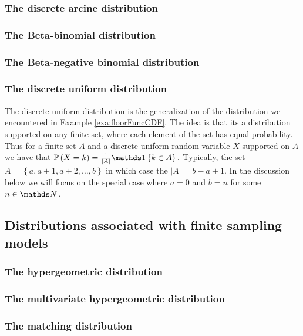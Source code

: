 \subsubsection{The discrete arcine distribution}

\subsubsection{The Beta-binomial distribution}

\subsubsection{The Beta-negative binomial distribution}

\subsubsection{The discrete uniform distribution\label{subsec:discreteUniformDistribution}}

The discrete uniform distribution is the generalization of the distribution
we encountered in Example \ref{exa:floorFuncCDF}. The idea is that
its a distribution supported on any finite set, where each element
of the set has equal probability. Thus for a finite set $A$ and a
discrete uniform random variable $X$ supported on $A$ we have that
$\P\left(X=k\right)=\frac{1}{\lvert A\rvert}\indicate\left\{ k\in A\right\} .$
Typically, the set $A=\left\{ a,a+1,a+2,\ldots,b\right\} $ in which
case the $\lvert A\rvert=b-a+1$. In the discussion below we will
focus on the special case where $a=0$ and $b=n$ for some $n\in\N$.


\subsection{Distributions associated with finite sampling models}

\subsubsection{The hypergeometric distribution}

\subsubsection{The multivariate hypergeometric distribution}

\subsubsection{The matching distribution}

